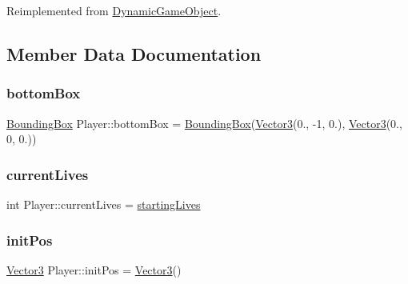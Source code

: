 Reimplemented from \hyperlink{class_dynamic_game_object_aaa505b57d131bbbce44d500ec2ca0e83}{Dynamic\+Game\+Object}.



\subsection{Member Data Documentation}
\mbox{\label{class_player_ae86b1de018c7db9a201935a1a67e9ce0}} 
\subsubsection{\texorpdfstring{bottom\+Box}{bottomBox}}
{\footnotesize\ttfamily \hyperlink{class_bounding_box}{Bounding\+Box} Player\+::bottom\+Box = \hyperlink{class_bounding_box}{Bounding\+Box}(\hyperlink{class_vector3}{Vector3}(0., -\/1, 0.), \hyperlink{class_vector3}{Vector3}(0., 0, 0.))\hspace{0.3cm}{\ttfamily [protected]}}

\mbox{\label{class_player_a6638b814a2cb74674b554d51a3e8a256}} 
\subsubsection{\texorpdfstring{current\+Lives}{currentLives}}
{\footnotesize\ttfamily int Player\+::current\+Lives = \hyperlink{class_player_a11d9ba38b586f5acfac4f2cd5233cbb4}{starting\+Lives}}

\mbox{\label{class_player_a6d0fe16db54a42ab13f0b8ed1ca0632c}} 
\subsubsection{\texorpdfstring{init\+Pos}{initPos}}
{\footnotesize\ttfamily \hyperlink{class_vector3}{Vector3} Player\+::init\+Pos = \hyperlink{class_vector3}{Vector3}()}

\mbox{\label{class_player_a9df1cbdc480439b69d82068b287ed071}} 
